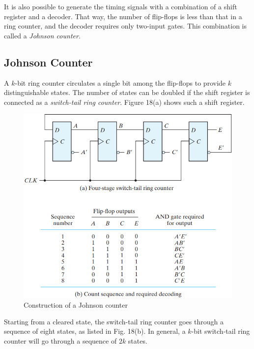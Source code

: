 It is also possible to generate the timing signals with a combination of 
a shift register and a decoder. That way, the number of flip-flops is less than that in a ring counter, and the decoder requires only two-input gates. This combination is called a \textit{Johnson counter}.

\vspace*{\fill}
\columnbreak

\subsection{Johnson Counter}
\label{subsec:johnson-counter}

A $k$-bit ring counter circulates a single bit among the flip-flops to provide $k$ distinguishable states. The number of states can be doubled if the shift register is connected as a \textit{switch-tail ring counter}. Figure 18(a) shows such a shift register.

\begin{figure}[H]
  \centering
  \includegraphics[width=\linewidth]{img/fig-6.18.png}
  \caption{Construction of a Johnson counter}
  \label{fig:6.18}
\end{figure}

Starting from a cleared state, the switch-tail ring counter goes through a sequence of eight states, as listed in Fig. 18(b). In general, a $k$-bit switch-tail ring counter will go through a sequence of $2k$ states.

\vspace*{\fill}
\columnbreak
